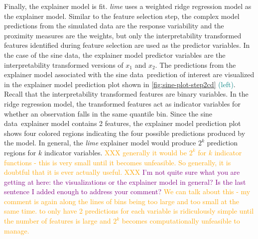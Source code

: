 \documentclass[AMS,STIX2COL]{WileyNJD-v2}\usepackage[]{graphicx}\usepackage[]{color}
\newcommand{\hh}[1]{\textcolor{orange}{#1}}
\newcommand{\kgc}[1]{\textcolor{purple}{#1}}
\newcommand{\kge}[1]{\textcolor{teal}{#1}}
\newcommand{\data}{sine data}
\begin{document}
{Finally, the explainer model is fit. \emph{lime} uses a weighted ridge regression model as the explainer model. Similar to the feature selection step, the complex model predictions from the simulated data are the response variability and the proximity measures are the weights, but only the interpretability transformed features identified during feature selection are used as the predictor variables. In the case of the \data, the explainer model predictor variables are the interpretability transformed versions of $x_1$ and $x_2$. The predictions from the explainer model associated with the \data \ prediction of interest are visualized in the explainer model prediction plot shown in \autoref{fig:sine-plot-step2cd} \kge{(left)}. Recall that the interpretability transformed features are binary variables. In the ridge regression model, the transformed features act as indicator variables for whether an observation falls in the same quantile bin. Since the \data \ explainer model contains 2 features, the explainer model prediction plot shows four colored regions indicating the four possible predictions produced by the model. In general, the \emph{lime} explainer model would produce $2^k$ prediction regions for $k$ indicator variables. \hh{XXX generally it would be $2^k$ for $k$ indicator functions - this is very small until it becomes unfeasible. So generally, it is doubtful that it is ever actually useful. XXX} \kgc{I'm not quite sure what you are getting at here: the visualizations or the explainer model in general? Is the last sentence I added enough to address your comment?} \hh{We can talk about this - my comment is again along the lines of bins being too large and too small at the same time. to only have 2 predictions for each variable is ridiculously simple until the number of features is large and $2^k$ becomes computationally unfeasible to manage.}



}
\end{document}
